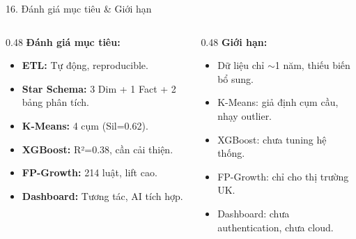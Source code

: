 \documentclass[10pt, aspectratio=169]{beamer}
\begin{document}
\begin{frame}{16. Đánh giá mục tiêu \& Giới hạn}
    \small
    \begin{columns}[T]
        \begin{column}{0.48\textwidth}
            \textbf{Đánh giá mục tiêu:}
            \begin{itemize}
                \item[\checkmark] \textbf{ETL:} Tự động, reproducible.
                \item[\checkmark] \textbf{Star Schema:} 3 Dim + 1 Fact + 2 bảng phân tích.
                \item[\checkmark] \textbf{K-Means:} 4 cụm (Sil=0.62).
                \item[$\sim$] \textbf{XGBoost:} R²=0.38, cần cải thiện.
                \item[\checkmark] \textbf{FP-Growth:} 214 luật, lift cao.
                \item[\checkmark] \textbf{Dashboard:} Tương tác, AI tích hợp.
            \end{itemize}
        \end{column}
        
        \begin{column}{0.48\textwidth}
            \textbf{Giới hạn:}
            \begin{itemize}
                \item Dữ liệu chỉ $\sim$1 năm, thiếu biến bổ sung.
                \item K-Means: giả định cụm cầu, nhạy outlier.
                \item XGBoost: chưa tuning hệ thống.
                \item FP-Growth: chỉ cho thị trường UK.
                \item Dashboard: chưa authentication, chưa cloud.
            \end{itemize}
        \end{column}
    \end{columns}
\end{frame}
\end{document}
